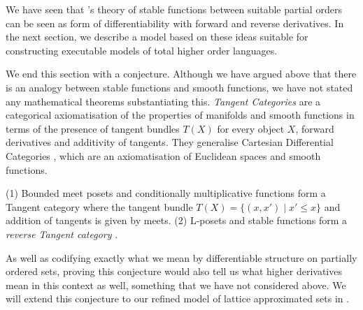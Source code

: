 We have seen that \citet{berry79}'s theory of stable functions between suitable partial orders can be seen as form of differentiability with forward and reverse derivatives. In the next section, we describe a model based on these ideas suitable for constructing executable models of total higher order languages.

We end this section with a conjecture. Although we have argued above
that there is an analogy between stable functions and smooth
functions, we have not stated any mathematical theorems substantiating
this. \emph{Tangent Categories} \cite{cockett14,cockett18} are a
categorical axiomatisation of the properties of manifolds and smooth
functions in terms of the presence of tangent bundles $T(X)$ for every
object $X$, forward derivatives and additivity of tangents. They
generalise Cartesian Differential Categories \cite{cdcs}, which are an
axiomatisation of Euclidean spaces and smooth functions.

\begin{conjecture}
  \label{con:tangent-stable-fns}
  (1) Bounded meet posets and conditionally multiplicative functions
  form a Tangent category where the tangent bundle
  $T(X) = \{(x,x') \mid x' \leq x\}$ and addition of tangents is given
  by meets. (2) L-posets and stable functions form a \emph{reverse
    Tangent category} \cite{reverse-tangents}.
\end{conjecture}

As well as codifying exactly what we mean by differentiable structure
on partially ordered sets, proving this conjecture would also tell us
what higher derivatives mean in this context as well, something that
we have not considered above. We will extend this conjecture to our
refined model of lattice approximated sets in .


